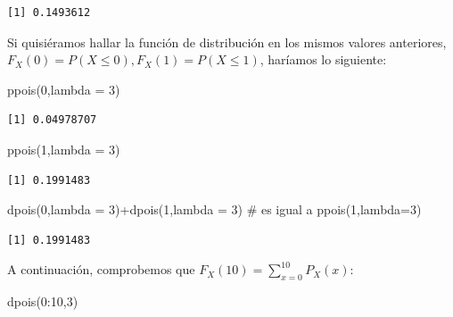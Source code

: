\documentclass[
  letterpaper,
  DIV=11,
  numbers=noendperiod]{scrreprt}
\newenvironment{Shaded}{\begin{snugshade}}{\end{snugshade}}
\newcommand{\AttributeTok}[1]{\textcolor[rgb]{0.40,0.45,0.13}{#1}}
\newcommand{\CommentTok}[1]{\textcolor[rgb]{0.37,0.37,0.37}{#1}}
\newcommand{\DecValTok}[1]{\textcolor[rgb]{0.68,0.00,0.00}{#1}}
\newcommand{\FunctionTok}[1]{\textcolor[rgb]{0.28,0.35,0.67}{#1}}
\newcommand{\NormalTok}[1]{\textcolor[rgb]{0.00,0.23,0.31}{#1}}
\newcommand{\SpecialCharTok}[1]{\textcolor[rgb]{0.37,0.37,0.37}{#1}}
\begin{document}
\begin{verbatim}
[1] 0.1493612
\end{verbatim}

Si quisiéramos hallar la función de distribución en los mismos valores
anteriores, \(F_X(0)=P(X\leq 0), F_X(1)=P(X\leq 1)\), haríamos lo
siguiente:

\begin{Shaded}
\begin{Highlighting}[]
\FunctionTok{ppois}\NormalTok{(}\DecValTok{0}\NormalTok{,}\AttributeTok{lambda =} \DecValTok{3}\NormalTok{)}
\end{Highlighting}
\end{Shaded}

\begin{verbatim}
[1] 0.04978707
\end{verbatim}

\begin{Shaded}
\begin{Highlighting}[]
\FunctionTok{ppois}\NormalTok{(}\DecValTok{1}\NormalTok{,}\AttributeTok{lambda =} \DecValTok{3}\NormalTok{)}
\end{Highlighting}
\end{Shaded}

\begin{verbatim}
[1] 0.1991483
\end{verbatim}

\begin{Shaded}
\begin{Highlighting}[]
\FunctionTok{dpois}\NormalTok{(}\DecValTok{0}\NormalTok{,}\AttributeTok{lambda =} \DecValTok{3}\NormalTok{)}\SpecialCharTok{+}\FunctionTok{dpois}\NormalTok{(}\DecValTok{1}\NormalTok{,}\AttributeTok{lambda =} \DecValTok{3}\NormalTok{) }\CommentTok{\# es igual a ppois(1,lambda=3)}
\end{Highlighting}
\end{Shaded}

\begin{verbatim}
[1] 0.1991483
\end{verbatim}

A continuación, comprobemos que
\(F_X(10)=\sum\limits_{x=0}^{10} P_X(x)\):

\begin{Shaded}
\begin{Highlighting}[]
\FunctionTok{dpois}\NormalTok{(}\DecValTok{0}\SpecialCharTok{:}\DecValTok{10}\NormalTok{,}\DecValTok{3}\NormalTok{)}
\end{Highlighting}
\end{Shaded}
\end{document}
